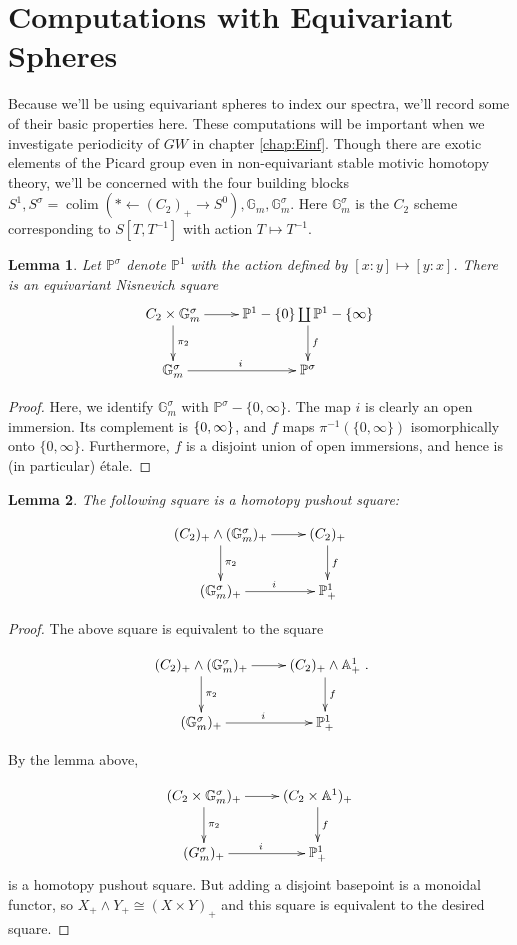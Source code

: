 \documentclass[edeposit,fullpage]{uiucthesis2009}
\newcommand{\mbb}{\mathbb}
\DeclareMathOperator*{\colim}{colim}
\theoremstyle{plain}
\newtheorem{lemma}{Lemma}
\numberwithin{lemma}{section}
\theoremstyle{definition}
\begin{document}
\section{Computations with Equivariant Spheres}

Because we'll be using equivariant spheres to index our spectra, we'll
record some of their basic properties here. These computations will be important when we investigate periodicity of $GW$ in chapter \ref{chap:Einf}. Though there are exotic
elements of the Picard group even in non-equivariant stable motivic
homotopy theory, we'll be concerned with the four building blocks
$S^1, S^\sigma = \colim (\ast \leftarrow (C_2)_+ \rightarrow S^0), \mbb G_m, \mbb
G_m^{\sigma}$. Here $\mbb G_m^\sigma$ is the $C_2$ scheme
corresponding to $S[T,T^{-1}]$ with action $T \mapsto T^{-1}$. 

\begin{lemma}
Let $\mbb P^\sigma$ denote $\mbb P^1$ with the action defined by $[x:y] \mapsto
[y:x]$. There is an equivariant Nisnevich square
\[
\xymatrix{C_2\times \mbb G_m^\sigma \ar[r]\ar[d]^{\pi_2} & \mbb P^1 -
  \{0\} \coprod \mbb P^1 - \{\infty\} \ar[d]^f \\ \mbb G_m^\sigma \ar[r]^i & \mbb P^\sigma}
\]
\end{lemma} 

\begin{proof}
Here, we identify $\mbb G_m^\sigma$ with $\mbb P^\sigma -
\{0,\infty\}$. The map $i$ is clearly an open immersion. Its
complement is $\mbb \{0,\infty\}$, and $f$ maps
$\pi^{-1}(\{0,\infty\})$ isomorphically onto
$\{0,\infty\}$. Furthermore, $f$ is a disjoint union of open
immersions, and hence is (in particular) \'etale. 
\end{proof}

\begin{lemma}
The following square is a homotopy pushout square:

\[
\xymatrix{(C_2)_+\wedge  (\mbb G_m^\sigma)_+ \ar[r]\ar[d]^{\pi_2} &
  (C_2)_+ \ar[d]^f \\ (\mbb G_m^\sigma)_+ \ar[r]^i & \mbb P_+^1}
\]
\end{lemma}

\begin{proof}
The above square is equivalent to the square

\[
\xymatrix{(C_2)_+\wedge  (\mbb G_m^\sigma)_+ \ar[r]\ar[d]^{\pi_2} &
  (C_2)_+ \wedge \mbb A^1_+ \ar[d]^f \\ (\mbb G_m^\sigma)_+ \ar[r]^i & \mbb P_+^1}.
\] 

By the lemma above, 

\[
\xymatrix{(C_2\times \mbb G_m^\sigma)_+ \ar[r]\ar[d]^{\pi_2} & (C_2
  \times \mbb A^1)_+\ar[d]^f \\ (G_m^\sigma)_+ \ar[r]^i & \mbb P_+^1}
\]
is a homotopy pushout square. But adding a disjoint basepoint is a
monoidal functor, so $X_+ \wedge Y_+ \cong (X \times Y)_+$ and this
square is equivalent to the desired square.
\end{proof}
\end{document}
